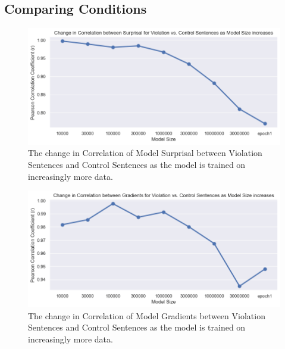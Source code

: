 \documentclass{IEEEtran}
\begin{document}
\subsection{Comparing Conditions}
\begin{figure}
    \centering
    \includegraphics[width=.9\textwidth]{correlation_change/surprisal_violations_vs_control.png}
    \caption{The change in Correlation of Model Surprisal between Violation Sentences and Control Sentences as the model is trained on increasingly more data.}
    \label{fig:correlation_surprisal_violation_control}
\end{figure}
\begin{figure}
    \centering
    \includegraphics[width=.9\textwidth]{correlation_change/gradients_violations_vs_control.png}
    \caption{The change in Correlation of Model Gradients between Violation Sentences and Control Sentences as the model is trained on increasingly more data.}
    \label{fig:correlation_gradients_violation_control}
\end{figure}
\end{document}
